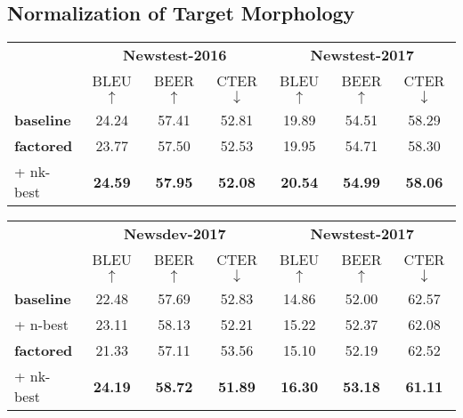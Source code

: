 \documentclass[11pt,letterpaper,final]{article}
\begin{document}
\subsection{Normalization of Target Morphology}
\label{subsec:normal}

\begin{table*}[!htbp]
\begin{center}
\small
\begin{tabular}{ lcccccc } 
\hline
  & \multicolumn{3}{c}{\textbf{Newstest-2016}} & \multicolumn{3}{c}{\textbf{Newstest-2017}} \\
  & BLEU $\uparrow$ & BEER $\uparrow$ & CTER $\downarrow$ & BLEU $\uparrow$ & BEER $\uparrow$ & CTER $\downarrow$ \\
\hline
\textbf{baseline} & 24.24 & 57.41 & 52.81 & 19.89 & 54.51 & 58.29 \\
\textbf{factored} & 23.77 & 57.50 & 52.53 & 19.95 & 54.71 & 58.30 \\
+ nk-best         & \textbf{24.59} & \textbf{57.95} & \textbf{52.08} & \textbf{20.54} & \textbf{54.99} & \textbf{58.06} \\
\hline
 \end{tabular} 
\caption{\label{tab:wmt_cs} Scores for English-to-Czech systems}
\end{center}

\begin{center}
\small
\begin{tabular}{ lcccccc } 
\hline
  & \multicolumn{3}{c}{\textbf{Newsdev-2017}} & \multicolumn{3}{c}{\textbf{Newstest-2017}} \\
  & BLEU $\uparrow$ & BEER $\uparrow$ & CTER $\downarrow$ & BLEU $\uparrow$ & BEER $\uparrow$ & CTER $\downarrow$ \\
\hline
\textbf{baseline} & 22.48 & 57.69 & 52.83 & 14.86 & 52.00 & 62.57 \\
+ n-best          & 23.11 & 58.13 & 52.21 & 15.22 & 52.37 & 62.08\\
\textbf{factored} & 21.33 & 57.11 & 53.56 & 15.10 & 52.19 & 62.52 \\
+ nk-best         & \textbf{24.19} & \textbf{58.72} & \textbf{51.89} & \textbf{16.30} & \textbf{53.18} & \textbf{61.11} \\
\hline
 \end{tabular} 
\caption{\label{tab:wmt_lv} Scores for English-to-Latvian systems}
\end{center}
\end{table*}
\end{document}
